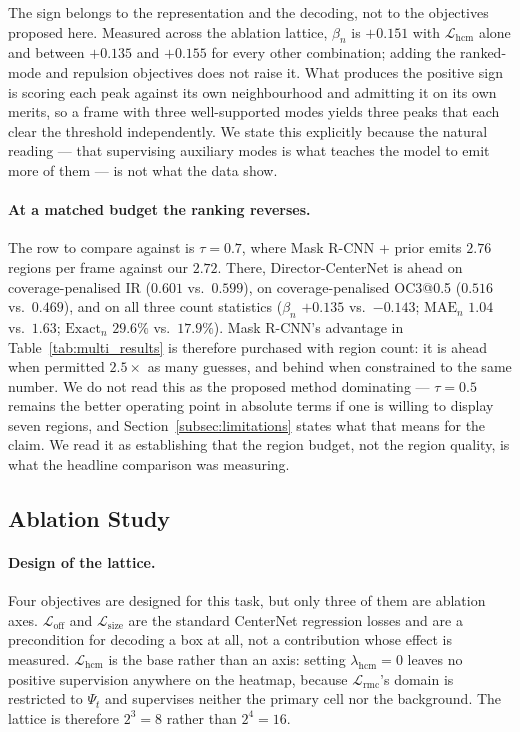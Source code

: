 \documentclass[preprint,12pt]{elsarticle}
\begin{document}
The sign belongs to the representation and the decoding, not to the objectives
proposed here. Measured across the ablation lattice, $\beta_n$ is $+0.151$ with
$\mathcal{L}_{\text{hcm}}$ alone and between $+0.135$ and $+0.155$ for every
other combination; adding the ranked-mode and repulsion objectives does not
raise it. What produces the positive sign is scoring each peak against its own
neighbourhood and admitting it on its own merits, so a frame with three
well-supported modes yields three peaks that each clear the threshold
independently. We state this explicitly because the natural reading — that
supervising auxiliary modes is what teaches the model to emit more of them — is
not what the data show.

\paragraph{At a matched budget the ranking reverses.} The row to compare
against is $\tau = 0.7$, where Mask R-CNN + prior emits $2.76$ regions per
frame against our $2.72$. There, Director-CenterNet is ahead on
coverage-penalised IR ($0.601$ vs.\ $0.599$), on coverage-penalised OC3@0.5
($0.516$ vs.\ $0.469$), and on all three count statistics
($\beta_n$ $+0.135$ vs.\ $-0.143$; $\text{MAE}_n$ $1.04$ vs.\ $1.63$;
$\text{Exact}_n$ $29.6\%$ vs.\ $17.9\%$). Mask R-CNN's advantage in
Table~\ref{tab:multi_results} is therefore purchased with region count: it is
ahead when permitted $2.5\times$ as many guesses, and behind when constrained to
the same number. We do not read this as the proposed method dominating —
$\tau = 0.5$ remains the better operating point in absolute terms if one is
willing to display seven regions, and Section~\ref{subsec:limitations} states
what that means for the claim. We read it as establishing that the region
budget, not the region quality, is what the headline comparison was measuring.

\subsection{Ablation Study}
\label{subsec:ablation}

\paragraph{Design of the lattice.} Four objectives are designed for this task,
but only three of them are ablation axes. $\mathcal{L}_{\text{off}}$ and
$\mathcal{L}_{\text{size}}$ are the standard CenterNet regression losses and
are a precondition for decoding a box at all, not a contribution whose effect
is measured. $\mathcal{L}_{\text{hcm}}$ is the base rather than an axis:
setting $\lambda_{\text{hcm}}=0$ leaves no positive supervision anywhere on the
heatmap, because $\mathcal{L}_{\text{rmc}}$'s domain is restricted to $\Psi_t$
and supervises neither the primary cell nor the background. The lattice is
therefore $2^3 = 8$ rather than $2^4 = 16$.
\end{document}
